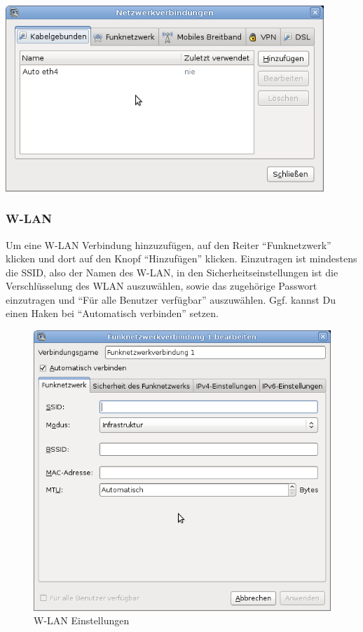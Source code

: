 \documentclass[a4paper,12pt,twoside]{article}
\begin{document}
\bigskip
\begin{minipage}{\linewidth}
    \centering
    \includegraphics[width=12cm]{efaLivede-img/efaLivede-img23.png}
    \label{fig:dialog_netzwerk}
\end{minipage}


\subsubsection{W-LAN}
\label{sct:wifi}
Um eine W-LAN Verbindung hinzuzufügen, auf den Reiter
"`Funknetzwerk"' klicken und dort auf den
Knopf "`Hinzufügen"' klicken. Einzutragen ist
mindestens die SSID, also der Namen des W-LAN, in den
Sicherheitseinstellungen ist die Verschlüsselung des WLAN auszuwählen,
sowie das zugehörige Passwort einzutragen und "`Für alle
Benutzer verfügbar"' auszuwählen. Ggf. kannst Du einen
Haken bei "`Automatisch verbinden"' setzen.

\begin{figure}
    \centering
    \includegraphics[width=13cm]{efaLivede-img/efaLivede-img24.png}
    \caption{W-LAN Einstellungen}
    \label{fig:wifi}
\end{figure}
\end{document}

